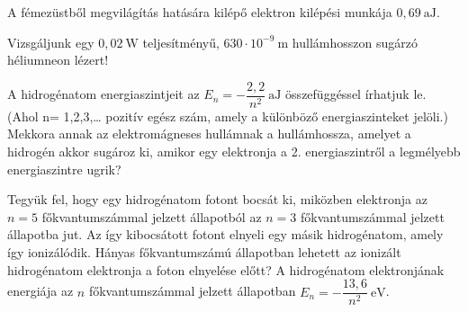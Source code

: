 \documentclass[addpoints,11pt,a4paper]{exam}
\begin{document}
	
	
	\begin{questions}
		\question A fémezüstből megvilágítás hatására kilépő elektron kilépési munkája $0,69 \mathrm{~aJ}$.  
		
		\question Vizsgáljunk egy $0,02\mathrm{~W}$ teljesítményű, $630\cdot 10^{-9}\mathrm{~m}$ hullámhosszon sugárzó héliumneon lézert!
		
		\question A hidrogénatom energiaszintjeit az  $E_n=-\dfrac{2,2}{n^{2}}\mathrm{~aJ}$ összefüggéssel írhatjuk le. (Ahol n= 1,2,3,… pozitív egész szám, amely a különböző energiaszinteket jelöli.) Mekkora annak az elektromágneses hullámnak a hullámhossza, amelyet a hidrogén akkor sugároz ki, amikor egy elektronja a 2. energiaszintről a legmélyebb energiaszintre ugrik?
		
		\question Tegyük fel, hogy egy hidrogénatom fotont bocsát ki, miközben elektronja az $n = 5$ főkvantumszámmal jelzett állapotból az $n = 3$ főkvantumszámmal jelzett állapotba jut. Az így kibocsátott fotont elnyeli egy másik hidrogénatom, amely így ionizálódik. Hányas főkvantumszámú állapotban lehetett az ionizált hidrogénatom elektronja a foton elnyelése előtt? A hidrogénatom elektronjának energiája az $n$ főkvantumszámmal jelzett állapotban $E_n = -\dfrac{13,6}{n^{2}}\mathrm{~eV}$. 
		

\end{questions}
\end{document}
